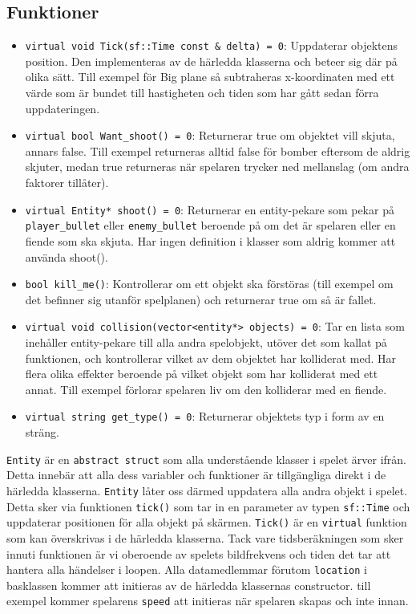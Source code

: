 \documentclass{TDP003mall}
\begin{document}
\subsection{Funktioner}
\begin{itemize}
\item \texttt{virtual void Tick(sf::Time const \& delta) = 0}: Uppdaterar objektens position. Den implementeras av de härledda klasserna och beteer sig där på olika sätt. 
Till exempel för Big plane så subtraheras x-koordinaten med ett värde som är bundet till hastigheten och tiden som har gått sedan förra uppdateringen.
\item \texttt{virtual bool Want\_shoot() = 0}: Returnerar true om objektet vill skjuta, annars false. Till exempel returneras alltid false för bomber eftersom de aldrig skjuter, 
medan true returneras när spelaren trycker ned mellanslag (om andra faktorer tillåter).
\item \texttt{virtual Entity* shoot() = 0}: Returnerar en entity-pekare som pekar på \texttt{player\_bullet} eller \texttt{enemy\_bullet} beroende på om det är spelaren eller en fiende som ska skjuta. 
Har ingen definition i klasser som aldrig kommer att använda shoot().
\item \texttt{bool kill\_me()}: Kontrollerar om ett objekt ska förstöras (till exempel om det befinner sig utanför spelplanen) och returnerar true om så är fallet.
\item \texttt{virtual void collision(vector<entity*> objects) = 0}: Tar en lista som inehåller entity-pekare till alla andra spelobjekt, utöver det som kallat på funktionen, 
och kontrollerar vilket av  dem objektet har kolliderat med. Har flera olika effekter beroende på vilket objekt som har kolliderat med ett annat. Till exempel förlorar spelaren liv om den kolliderar med en fiende. 
\item \texttt{virtual string get\_type() = 0}: Returnerar objektets typ i form av en sträng. 
\end{itemize}

\texttt{Entity} är en \texttt{abstract struct} som alla understående klasser i spelet ärver ifrån. Detta innebär att alla dess variabler och funktioner är tillgängliga direkt i de härledda klasserna.
\texttt{Entity} låter oss därmed uppdatera alla andra objekt i spelet. 
Detta sker via funktionen \texttt{tick()} som tar in en parameter av typen \texttt{sf::Time} och uppdaterar positionen för alla objekt på skärmen. 
\texttt{Tick()} är en \texttt{virtual} funktion som kan överskrivas i de härledda klasserna.
Tack vare tidsberäkningen som sker innuti funktionen är vi oberoende av spelets bildfrekvens och tiden det tar att hantera alla händelser i loopen.
Alla datamedlemmar förutom \texttt{location} i basklassen kommer att initieras av de härledda klassernas constructor. 
till exempel kommer spelarens \texttt{speed} att initieras när spelaren skapas och inte innan.
\end{document}
